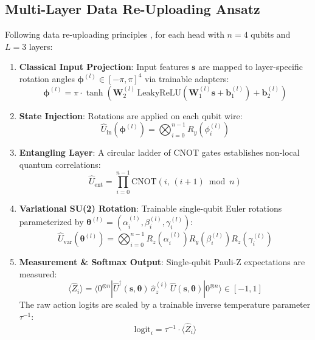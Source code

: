 \documentclass[conference]{IEEEtran}
\begin{document}
\subsection{Multi-Layer Data Re-Uploading Ansatz}
Following data re-uploading principles \cite{perez2020data,jerbi2021parametrized}, for each head with $n=4$ qubits and $L=3$ layers:
\begin{enumerate}
    \item \textbf{Classical Input Projection}: Input features $\mathbf{s}$ are mapped to layer-specific rotation angles $\boldsymbol{\phi}^{(l)} \in [-\pi, \pi]^4$ via trainable adapters:
    \begin{equation}
        \boldsymbol{\phi}^{(l)} = \pi \cdot \tanh(\mathbf{W}_2^{(l)} \, \text{LeakyReLU}(\mathbf{W}_1^{(l)} \mathbf{s} + \mathbf{b}_1^{(l)}) + \mathbf{b}_2^{(l)})
    \end{equation}
    \item \textbf{State Injection}: Rotations are applied on each qubit wire:
    \begin{equation}
        \hat{U}_{\text{in}}(\boldsymbol{\phi}^{(l)}) = \bigotimes_{i=0}^{n-1} R_y(\phi_i^{(l)})
    \end{equation}
    \item \textbf{Entangling Layer}: A circular ladder of CNOT gates establishes non-local quantum correlations:
    \begin{equation}
        \hat{U}_{\text{ent}} = \prod_{i=0}^{n-1} \text{CNOT}(i, \, (i+1) \bmod n)
    \end{equation}
    \item \textbf{Variational SU(2) Rotation}: Trainable single-qubit Euler rotations parameterized by $\boldsymbol{\theta}^{(l)} = (\alpha_i^{(l)}, \beta_i^{(l)}, \gamma_i^{(l)})$:
    \begin{equation}
        \hat{U}_{\text{var}}(\boldsymbol{\theta}^{(l)}) = \bigotimes_{i=0}^{n-1} R_z(\alpha_i^{(l)}) R_y(\beta_i^{(l)}) R_z(\gamma_i^{(l)})
    \end{equation}
    \item \textbf{Measurement \& Softmax Output}: Single-qubit Pauli-Z expectations are measured:
    \begin{equation}
        \langle \hat{Z}_i \rangle = \langle 0^{\otimes n} | \hat{U}^\dagger (\mathbf{s}, \boldsymbol{\theta}) \, \hat{\sigma}_z^{(i)} \, \hat{U} (\mathbf{s}, \boldsymbol{\theta}) | 0^{\otimes n} \rangle \in [-1, 1]
    \end{equation}
    The raw action logits are scaled by a trainable inverse temperature parameter $\tau^{-1}$:
    \begin{equation}
        \text{logit}_i = \tau^{-1} \cdot \langle \hat{Z}_i \rangle
    \end{equation}
\end{enumerate}
\end{document}
